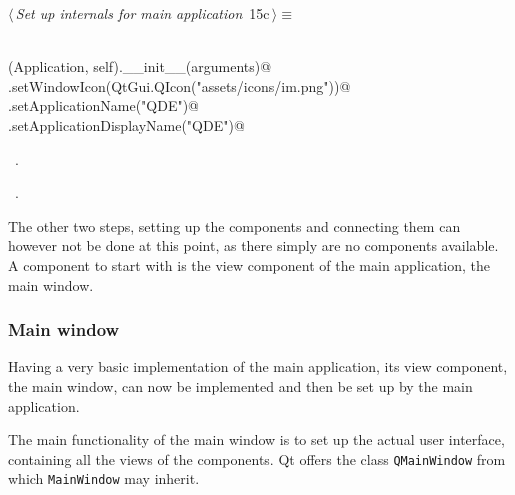 \documentclass[
    a4paper,      %
    10pt,         %
    openright,    %
    notitlepage,  %
    parskip=half, %
]{scrreprt}       %
\theoremstyle{definition}                    %
\begin{document}
\begin{flushleft} \small
\begin{minipage}{\linewidth}\label{scrap4}\raggedright\small
{} $\langle\,${\itshape Set up internals for main application}\nobreak\ {\footnotesize {15c}}$\,\rangle\equiv$
\vspace{-1exm}
\begin{list}{}{} \item
\mbox{}\lstinline@@\\
\mbox{}\lstinline@super(Application, self).__init__(arguments)@\\
\mbox{}\lstinline@self.setWindowIcon(QtGui.QIcon("assets/icons/im.png"))@\\
\mbox{}\lstinline@self.setApplicationName("QDE")@\\
\mbox{}\lstinline@self.setApplicationDisplayName("QDE")@{\NWsep}
\end{list}
\vspace{-1.5ex}
\footnotesize
\begin{list}{}{\setlength{\itemsep}{-\parsep}\setlength{\itemindent}{-\leftmargin}}
\item \NWtxtMacroDefBy\ .
\item \NWtxtMacroRefIn\ .

\item{}
\end{list}
\end{minipage}\vspace{4ex}
\end{flushleft}
The other two steps, setting up the components and connecting them can however
not be done at this point, as there simply are no components available. A
component to start with is the view component of the main application, the main
window.

\subsubsection{Main window}
\label{ssubsec:main-window}

Having a very basic implementation of the main application, its view component,
the main window, can now be implemented and then be set up by the main
application.

The main functionality of the main window is to set up the actual user
interface, containing all the views of the components. Qt offers the class
\verb+QMainWindow+ from which \verb=MainWindow= may inherit.
\end{document}
